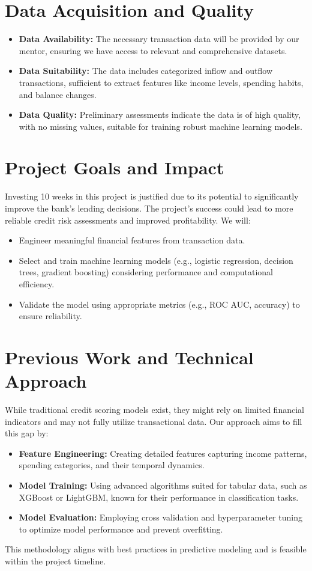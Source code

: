 \documentclass[12pt,letterpaper]{article}
\begin{document}
\section{Data Acquisition and Quality}

\begin{itemize}
    \item \textbf{Data Availability:} The necessary transaction data will be provided by our mentor, ensuring we have access to relevant and comprehensive datasets.
    \item \textbf{Data Suitability:} The data includes categorized inflow and outflow transactions, sufficient to extract features like income levels, spending habits, and balance changes.
    \item \textbf{Data Quality:} Preliminary assessments indicate the data is of high quality, with no missing values, suitable for training robust machine learning models.
\end{itemize}

\section{Project Goals and Impact}

Investing 10 weeks in this project is justified due to its potential to significantly improve the bank's lending decisions. The project's success could lead to more reliable credit risk assessments and improved profitability. We will:
\begin{itemize}
    \item Engineer meaningful financial features from transaction data.
    \item Select and train machine learning models (e.g., logistic regression, decision trees, gradient boosting) considering performance and computational efficiency.
    \item Validate the model using appropriate metrics (e.g., ROC AUC, accuracy) to ensure reliability.
\end{itemize}

\section{Previous Work and Technical Approach}

While traditional credit scoring models exist, they might rely on limited financial indicators and may not fully utilize transactional data. Our approach aims to fill this gap by:

\begin{itemize}
    \item \textbf{Feature Engineering:} Creating detailed features capturing income patterns, spending categories, and their temporal dynamics.
    \item \textbf{Model Training:} Using advanced algorithms suited for tabular data, such as XGBoost or LightGBM, known for their performance in classification tasks.
    \item \textbf{Model Evaluation:} Employing cross validation and hyperparameter tuning to optimize model performance and prevent overfitting.
\end{itemize}
This methodology aligns with best practices in predictive modeling and is feasible within the project timeline.
\end{document}
